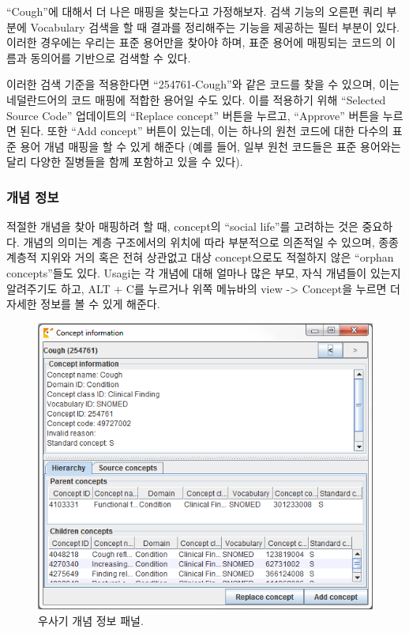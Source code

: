 \documentclass[11pt]{book}
\theoremstyle{definition}
\theoremstyle{definition}
\theoremstyle{definition}
\theoremstyle{remark}
\begin{document}
``Cough''에 대해서 더 나은 매핑을 찾는다고 가정해보자. 검색 기능의
오른편 쿼리 부분에 Vocabulary 검색을 할 때 결과를 정리해주는 기능을
제공하는 필터 부분이 있다. 이러한 경우에는 우리는 표준 용어만을 찾아야
하며, 표준 용어에 매핑되는 코드의 이름과 동의어를 기반으로 검색할 수
있다.

이러한 검색 기준을 적용한다면 ``254761-Cough''와 같은 코드를 찾을 수
있으며, 이는 네덜란드어의 코드 매핑에 적합한 용어일 수도 있다. 이를
적용하기 위해 ``Selected Source Code'' 업데이트의 ``Replace concept''
버튼을 누르고, ``Approve'' 버튼을 누르면 된다. 또한 ``Add concept''
버튼이 있는데, 이는 하나의 원천 코드에 대한 다수의 표준 용어 개념 매핑을
할 수 있게 해준다 (예를 들어, 일부 원천 코드들은 표준 용어와는 달리
다양한 질병들을 함께 포함하고 있을 수 있다).

\subsubsection*{개념 정보}\label{-}

적절한 개념을 찾아 매핑하려 할 때, concept의 ``social life''를 고려하는
것은 중요하다. 개념의 의미는 계층 구조에서의 위치에 따라 부분적으로
의존적일 수 있으며, 종종 계층적 지위와 거의 혹은 전혀 상관없고 대상
concept으로도 적절하지 않은 ``orphan concepts''들도 있다. Usagi는 각
개념에 대해 얼마나 많은 부모, 자식 개념들이 있는지 알려주기도 하고, ALT
+ C를 누르거나 위쪽 메뉴바의 view -\textgreater{} Concept을 누르면 더
자세한 정보를 볼 수 있게 해준다.

\begin{figure}

{\centering \includegraphics[width=1\linewidth]{images/ExtractTransformLoad/usagiConceptInfo} 

}

\caption{우사기 개념 정보 패널.}\label{fig:usagiConceptInfo}
\end{figure}
\end{document}
